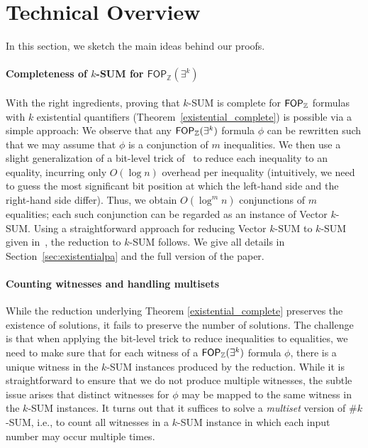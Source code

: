\section{Technical Overview}
\label{sec:TechnicalOverview}

In this section, we sketch the main ideas behind our proofs.
\paragraph*{Completeness of $k$-SUM for $\mathsf{FOP_{\mathbb{Z}}}(\exists^k)$}
With the right ingredients, proving that $k$-SUM is complete for $\mathsf{FOP}_{\mathbb{Z}}$ formulas with $k$ existential quantifiers (Theorem~\ref{existential_complete}) is possible via a simple approach: We observe that any $\mathsf{FOP}_{\mathbb{Z}}(\exists^k)$ formula $\phi$ can be rewritten such that we may assume that $\phi$  is a conjunction of $m$ inequalities. We then use a slight generalization of a bit-level trick of~\cite{DBLP:journals/siamcomp/WilliamsW13} to reduce each inequality to an equality, incurring only $O(\log n)$ overhead per inequality (intuitively, we need to guess the most significant bit position at which the left-hand side and the right-hand side differ).
Thus, we obtain $O(\log^m n)$ conjunctions of $m$ equalities; each such conjunction can be regarded as an instance of Vector $k$-SUM. Using a straightforward approach for reducing Vector $k$-SUM to $k$-SUM given in~\cite{DBLP:journals/corr/AbboudLW13}, the reduction to $k$-SUM follows. We give all details in Section~\ref{sec:existentialpa} and the full version of the paper.

 

\paragraph*{Counting witnesses and handling multisets}
While the reduction underlying Theorem \ref{existential_complete} preserves the existence of solutions, it fails 
to preserve the number of solutions. The challenge is that when applying the bit-level trick to reduce inequalities to equalities, we need to make sure that for each witness of a $\mathsf{FOP}_{\mathbb{Z}}(\exists^k)$ formula $\phi$, there is a unique witness in the $k$-SUM instances produced by the reduction. While it is straightforward to ensure that we do not produce multiple witnesses, the subtle issue arises that distinct witnesses for $\phi$ may be mapped to the same witness in the $k$-SUM instances. It turns out that it suffices to solve a \emph{multiset} version of \#$k$-SUM, i.e., to count all witnesses in a $k$-SUM instance in which each input number may occur multiple times. 

